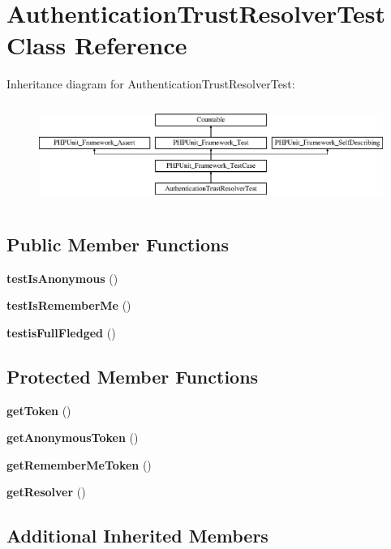 \section{Authentication\+Trust\+Resolver\+Test Class Reference}
\label{class_symfony_1_1_component_1_1_security_1_1_core_1_1_tests_1_1_authentication_1_1_authentication_trust_resolver_test}
Inheritance diagram for Authentication\+Trust\+Resolver\+Test\+:\begin{figure}[H]
\begin{center}
\leavevmode
\includegraphics[height=3.303835cm]{class_symfony_1_1_component_1_1_security_1_1_core_1_1_tests_1_1_authentication_1_1_authentication_trust_resolver_test}
\end{center}
\end{figure}
\subsection*{Public Member Functions}
\begin{DoxyCompactItemize}
\item 
{\bf test\+Is\+Anonymous} ()
\item 
{\bf test\+Is\+Remember\+Me} ()
\item 
{\bf testis\+Full\+Fledged} ()
\end{DoxyCompactItemize}
\subsection*{Protected Member Functions}
\begin{DoxyCompactItemize}
\item 
{\bf get\+Token} ()
\item 
{\bf get\+Anonymous\+Token} ()
\item 
{\bf get\+Remember\+Me\+Token} ()
\item 
{\bf get\+Resolver} ()
\end{DoxyCompactItemize}
\subsection*{Additional Inherited Members}


